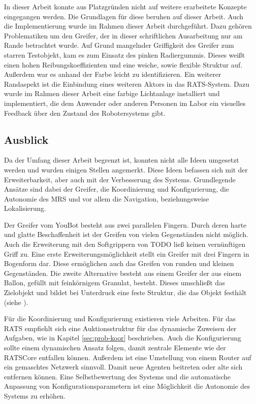 In dieser Arbeit konnte aus Platzgründen nicht auf weitere erarbeitete Konzepte eingegangen werden. Die Grundlagen für diese beruhen auf dieser Arbeit. Auch die Implementierung wurde im Rahmen dieser Arbeit durchgeführt. Dazu gehören Problematiken um den Greifer, der in dieser schriftlichen Ausarbeitung nur am Rande betrachtet wurde. Auf Grund mangelnder Griffigkeit des Greifer zum starren Testobjekt, kam es zum Einsatz des pinken Radiergummis. Dieses weißt einen hohen Reibungskoeffizienten und eine weiche, sowie flexible Struktur auf. Außerdem war es anhand der Farbe leicht zu identifizieren. Ein weiterer Randaspekt ist die Einbindung eines weiteren Aktors in das RATS-System. Dazu wurde im Rahmen dieser Arbeit eine farbige Lichtanlage installiert und implementiert, die dem Anwender oder anderen Personen im Labor ein visuelles Feedback über den Zustand des Robotersystems gibt.

\subsection{Ausblick}
\label{sec:ausblick}
Da der Umfang dieser Arbeit begrenzt ist, konnten nicht alle Ideen umgesetzt werden und wurden einigen Stellen angemerkt. Diese Ideen befassen sich mit der Erweiterbarkeit, aber auch mit der Verbesserung des Systems. Grundlegende Ansätze sind dabei der Greifer, die Koordinierung und Konfigurierung, die Autonomie des MRS und vor allem die Navigation, beziehungsweise Lokalisierung.

Der Greifer vom YouBot besteht aus zwei parallelen Fingern. Durch deren harte und glatte Beschaffenheit ist der Greifen von vielen Gegenständen nicht möglich. Auch die Erweiterung mit den Softgrippern von TODO ließ keinen vernünftigen Griff zu. Eine erste Erweiterungsmöglichkeit stellt ein Greifer mit drei Fingern in Bogenform dar. Diese ermöglichen auch das Greifen von runden und kleinen Gegenständen. Die zweite Alternative besteht aus einem Greifer der aus einem Ballon, gefüllt mit feinkörnigem Granulat, besteht. Dieses umschließt das Zielobjekt und bildet bei Unterdruck eine feste Struktur, die das Objekt festhält (siehe \cite{amend2012positive}).

Für die Koordinierung und Konfigurierung existieren viele Arbeiten. Für das RATS empfiehlt sich eine Auktionsstruktur für das dynamische Zuweisen der Aufgaben, wie in Kapitel \ref{sec:prob-koor} beschrieben. Auch die Konfigurierung sollte einem dynamischen Ansatz folgen, damit zentrale Elemente wie der RATSCore entfallen können. Außerdem ist eine Umstellung von einem Router auf ein gemaschtes Netzwerk sinnvoll. Damit neue Agenten beitreten oder alte sich entfernen können. Eine Selbstbewertung des Systems und die automatische Anpassung von Konfigurationsparametern ist eine Möglichkeit die Autonomie des Systems zu erhöhen.


